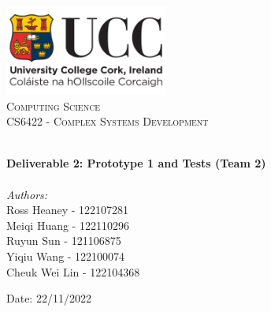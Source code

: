 
\begin{titlepage}
\vbox{ }
\vbox{ }
\begin{center}
\includegraphics[width=0.40\textwidth]{images/ucc_logo.png}\\[1cm]
\textsc{\LARGE Computing Science}\\[1.5cm]
\textsc{\Large CS6422 - Complex Systems Development}\\[0.5cm]
\vbox{ }

\HRule \\[0.4cm]
{ \huge \bfseries Deliverable 2: Prototype 1 and Tests (Team 2)}\\[0.4cm]
\HRule \\[1.5cm]

\large
\emph{Authors:}\\
Ross Heaney - 122107281\\
Meiqi Huang - 122110296\\
Ruyun Sun - 121106875\\
Yiqiu Wang - 122100074\\
Cheuk Wei Lin - 122104368\\
\vfill

{\large Date: 22/11/2022}
\end{center}
\end{titlepage}
